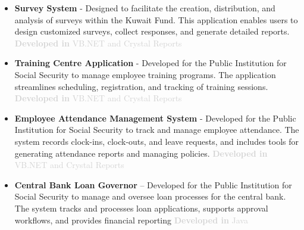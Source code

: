 \documentclass[11pt]{article}
\begin{document}
\begin{itemize}
               \vspace{0.8em} %
                \item \textbf{Survey System} -  \label{sec: Kfund-Survey} Designed to facilitate the creation, distribution, and analysis of surveys within the Kuwait Fund. This application enables users to design customized surveys, collect responses, and generate detailed reports. {\textcolor{lightgray} { \textbf{Developed in}  VB.NET and Crystal Reports}} 
               \vspace{0.8em} %
                    \item  \textbf{Training Centre Application}   \label{sec: Kfund-Training} - Developed for the Public Institution for Social Security to manage employee training programs. The application streamlines scheduling, registration, and tracking of training sessions. {\textcolor{lightgray} { \textbf{Developed in}  VB.NET and Crystal Reports }} 
\vspace{0.8em} %
      \label{sec: pifss-Attendance} 
     \item  \textbf{Employee Attendance Management System} -  Developed for the Public Institution for Social Security to track and manage employee attendance. The system records clock-ins, clock-outs, and leave requests, and includes tools for generating attendance reports and managing policies.  {\textcolor{lightgray} { \textbf{Developed in}  VB.NET and Crystal Reports }} 
\vspace{0.8em} %
     \label{sec: pifss-Bank} 
     \item  \textbf{Central Bank Loan Governor} – Developed for the Public Institution for Social Security to manage and oversee loan processes for the central bank. The system tracks and processes loan applications, supports approval workflows, and provides financial reporting {\textcolor{lightgray} { \textbf{Developed in}  Java }} 







\end{itemize}
\end{document}
